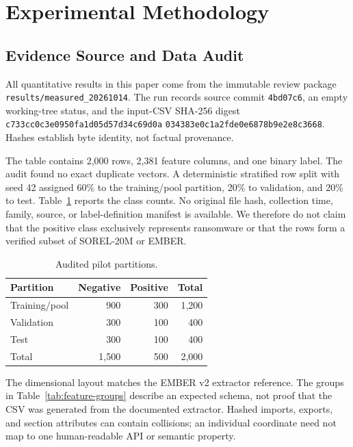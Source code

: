 \section{Experimental Methodology}
\label{sec:exp}

\subsection{Evidence Source and Data Audit}

All quantitative results in this paper come from the immutable review package
\texttt{results/measured\_20261014}. The run records source commit
\texttt{4bd07c6}, an empty working-tree status, and the input-CSV SHA-256 digest
\texttt{c733cc0c3e0950fa1d05d57d34c69d0a}\-
\texttt{034383e0c1a2fde0e6878b9e2e8c3668}. Hashes establish byte identity, not
factual provenance.

The table contains 2,000 rows, 2,381 feature columns, and one binary label. The
audit found no exact duplicate vectors. A deterministic stratified row split with
seed 42 assigned 60\% to the training/pool partition, 20\% to validation, and
20\% to test. Table~\ref{tab:data} reports the class counts. No original file hash,
collection time, family, source, or label-definition manifest is available. We
therefore do not claim that the positive class exclusively represents ransomware
or that the rows form a verified subset of SOREL-20M or EMBER.

\begin{table}[t]
\centering
\caption{Audited pilot partitions.}
\label{tab:data}
\small
\begin{tabular}{lrrr}
\toprule
Partition & Negative & Positive & Total \\
\midrule
Training/pool & 900 & 300 & 1,200 \\
Validation & 300 & 100 & 400 \\
Test & 300 & 100 & 400 \\
\midrule
Total & 1,500 & 500 & 2,000 \\
\bottomrule
\end{tabular}
\end{table}

The dimensional layout matches the EMBER v2 extractor reference. The groups in
Table~\ref{tab:feature-groups} describe an expected schema, not proof that the
CSV was generated from the documented extractor. Hashed imports, exports, and
section attributes can contain collisions; an individual coordinate need not map
to one human-readable API or semantic property.

